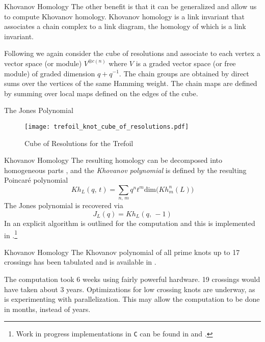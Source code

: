 \documentclass{beamer}
\begin{document}
    \begin{frame}{Khovanov Homology}
        The other benefit is that it can be generalized and allow us to compute
        Khovanov homology. Khovanov homology is a link invariant that
        associates a chain complex to a link diagram, the homology of which
        is a link invariant.
        \par\hfill\par
        Following \cite{BarNatanKhovanovJones} we again consider the cube of
        resolutions and associate to each vertex a vector space (or module)
        $V^{\otimes{c(n)}}$ where $V$ is a graded vector space (or free module)
        of graded dimension $q+q^{-1}$. The chain groups are obtained by
        direct sums over the vertices of the same Hamming weight. The chain
        maps are defined by summing over local maps defined on the edges of
        the cube.
    \end{frame}
    \begin{frame}{The Jones Polynomial}
        \begin{figure}
            \centering
            \texttt{[image: trefoil\_knot\_cube\_of\_resolutions.pdf]}
            \caption{Cube of Resolutions for the Trefoil}
        \end{figure}
    \end{frame}
    \begin{frame}{Khovanov Homology}
        The resulting homology can be decomposed into homogeneous parts
        \cite{KatlasKhoHo}, and the \textit{Khovanov polynomial} is defined
        by the resulting Poincar\'{e} polynomial
        \begin{equation}
            Kh_{L}(q,\,t)=\sum_{n,\,m}q^{n}t^{m}
                \textrm{dim}\big(Kh_{m}^{n}(L)\big)
        \end{equation}
        The Jones polynomial is recovered via
        \begin{equation}
            J_{L}(q)=Kh_{L}(q,\,-1)
        \end{equation}
        In \cite{BarNatan2006FASTKH} an explicit algorithm is outlined for
        the computation and this is implemented in \cite{JavaKhv2}.\footnote{%
            Work in progress implementations in \texttt{C} can be found in
            \cite{MaguireKnotData} and \cite{MaguireLibtmpl}.
        }
    \end{frame}
    \begin{frame}{Khovanov Homology}
        The Khovanov polynomial of all prime knots up to 17 crossings has been
        tabulated and is available in \cite{KhovanovData}.
        \par\hfill\par
        The computation took 6 weeks using fairly powerful hardware.
        19 crossings would have taken about 3 years. Optimizations for low
        crossing knots are underway, as is experimenting with parallelization.
        This may allow the computation to be done in months, instead of years.
    \end{frame}
\end{document}
